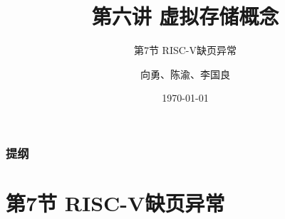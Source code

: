 


\title[第6讲]{第六讲 虚拟存储概念} %
\subtitle{第7节 RISC-V缺页异常}
\author{向勇、陈渝、李国良} %
\date{\today} %



\begin{frame}
\titlepage %
\end{frame}

\begin{frame}
\frametitle{提纲} %
\tableofcontents %
\end{frame}
\section{第7节 RISC-V缺页异常}%
